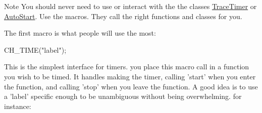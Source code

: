 \begin{DoxyNote}{Note}
You should never need to use or interact with the the classes \hyperlink{classTraceTimer}{Trace\+Timer} or \hyperlink{classAutoStart}{Auto\+Start}. Use the macros. They call the right functions and classes for you.
\end{DoxyNote}
The first macro is what people will use the most\+: 
\begin{DoxyCode}
CH\_TIME(\textcolor{stringliteral}{"label"});
\end{DoxyCode}
 \begin{DoxyVerb} This is the simplest interface for timers.  you place this macro call in a function
 you wish to be timed.  It handles making the timer, calling 'start' when you
 enter the function, and calling 'stop' when you leave the function.  A good
 idea is to use a 'label' specific enough to be unambiguous without being
 overwhelming.  for instance:
\end{DoxyVerb}




